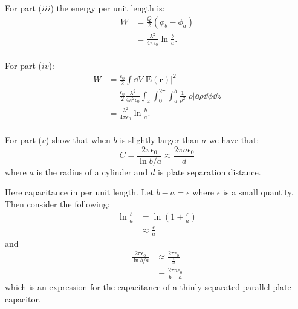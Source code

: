\begin{enumerate}
    For part ($iii$) the energy per unit length is:
    \begin{align*}
        W
        &=\frac{Q}{2}(\phi_b-\phi_a) \\
        &=\frac{\lambda^2}
        {4\pi\epsilon_0}\ln\frac{b}{a}. \\
    \end{align*}

    For part ($iv$):
    \begin{align*}
        W
        &=\frac{\epsilon_0}{2}
        \int\dd V |\boldsymbol{E}(\boldsymbol{r})|^2 \\
        &=\frac{\epsilon_0}{2}
        \frac{\lambda^2}{4\pi^2\epsilon_0}
        \int_z\int_{0}^{2\pi}\int_{a}^{b}
        \frac{1}{\rho^2}|\rho|
        \dd\rho\dd\phi\dd z \\
        &=\frac{\lambda^2}
        {4\pi\epsilon_0}\ln\frac{b}{a}. \\
    \end{align*}

    For part ($v$) show that when
    $b$ is slightly larger than $a$ we have that:
    $$C=\frac{2\pi\epsilon_0}{\ln b/a}
    \approx \frac{2\pi a\epsilon_0}{d}$$
    where $a$ is the radius of a cylinder
    and $d$ is plate separation distance.

    Here capacitance in per unit length.
    Let $b-a=\epsilon$ where $\epsilon$
    is a small quantity. Then consider the following:
    \begin{align*}
        \ln\frac{b}{a}
        &=\ln\left(1+\frac{\epsilon}{a}\right) \\
        &\approx\frac{\epsilon}{a}
    \end{align*}
    and
    \begin{align*}
        \frac{2\pi\epsilon_0}{\ln b/a}
        &\approx\frac{2\pi\epsilon_0}{\frac{\epsilon}{a}} \\
        &=\frac{2\pi a\epsilon_0}{b-a}
    \end{align*}
    which is an expression for the capacitance of
    a thinly separated parallel-plate capacitor.
\end{enumerate}